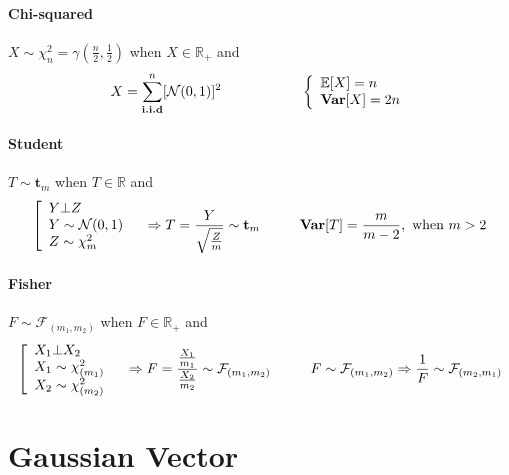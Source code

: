 \documentclass[a4paper,10pt]{article}
\begin{document}
\paragraph{Chi-squared} $X\sim \chi^2_n= \gamma(\frac{n}{2}, \frac{1}{2})$ when  $X \in \mathbb{R}_+$ and
\[
X = \sum^{n}_{\textbf{i.i.d}} [ \mathcal{N}(0,1) ]^2
\hspace{20mm}
\left\{
\begin{array}{l}
\mathbb{E}[X]= n \\
\textbf{Var}[X]=2n
\end{array}\right.
\]


\paragraph{Student} $T\sim \textbf{t}_m$ when  $T \in \mathbb{R}$ and
\[
\left[
\begin{array}{l}
Y \bot Z                \\
Y \sim \mathcal{N}(0,1) \\
Z \sim  \chi^2_m  
\end{array}\right.
\hspace{3mm} \Rightarrow
T=\frac{Y}{\sqrt{\frac{Z}{m}}} \sim \textbf{t}_m
\hspace{10mm}
\textbf{Var}[T]= \frac{m}{m-2} , \text{  when } m>2 
\]


\paragraph{Fisher} $F\sim \mathcal{F}_{(m_1,m_2)}$ when  $F \in \mathbb{R}_+$ and
\[
\left[
\begin{array}{l}
X_1 \bot X_2            \\
X_1 \sim \chi^2_{(m_1)} \\
X_2 \sim \chi^2_{(m_2)}
\end{array}\right.
\hspace{3mm} \Rightarrow
F=\frac{\frac{X_1}{m_1}}{\frac{X_2}{m_2}} \sim \mathcal{F}_{(m_1,m_2)}
\hspace{10mm}
F\sim \mathcal{F}_{(m_1,m_2)} \Rightarrow \frac{1}{F} \sim \mathcal{F}_{(m_2,m_1)} 
\]



\section{Gaussian Vector}
\end{document}
